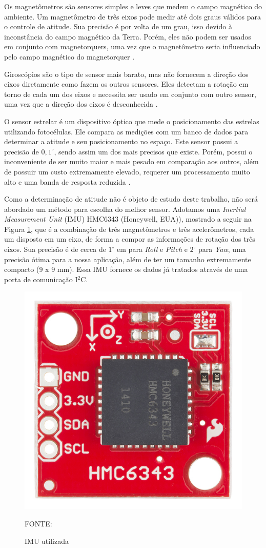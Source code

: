 \documentclass[
	12pt,				%
	openany,			%
	twoside,			%
	a4paper,			%
	english,			%
	french,				%
	spanish,			%
	brazil,				%
	oldfontcommands
	]{abntex2}
\begin{document}
Os magnetômetros são sensores simples e leves que medem o campo magnético do ambiente. Um magnetômetro de três eixos pode medir até dois graus válidos para o controle de atitude. Sua precisão é por volta de um grau, isso devido à inconstância do campo magnético da Terra. Porém, eles não podem ser usados em conjunto com magnetorquers, uma vez que o magnetômetro seria influenciado pelo campo magnético do magnetorquer \cite{FrancLav}.

Giroscópios são o tipo de sensor mais barato, mas não fornecem a direção dos eixos diretamente como fazem os outros sensores. Eles detectam a rotação em torno de cada um dos eixos e necessita ser usado em conjunto com outro sensor, uma vez que a direção dos eixos é desconhecida \cite{FrancLav}.

O sensor estrelar é um dispositivo óptico que mede o posicionamento das estrelas utilizando fotocélulas. Ele compara as medições com um banco de dados para determinar a atitude e seu posicionamento no espaço. Este sensor possui a precisão de $0,1^{\circ}$, sendo assim um dos mais precisos que existe. Porém, possui o inconveniente de ser muito maior e mais pesado em comparação aos outros, além de possuir um custo extremamente elevado, requerer um processamento muito alto e uma banda de resposta reduzida \cite{FrancLav}.

Como a determinação de atitude não é objeto de estudo deste trabalho, não será abordado um método para escolha do melhor sensor. Adotamos uma \textit{Inertial Measurement Unit} (IMU) HMC6343 (Honeywell, EUA)), mostrado a seguir na Figura \ref{fig:IMU}, que é a combinação de três magnetômetros e três acelerômetros, cada um disposto em um eixo, de forma a compor as informações de rotação dos três eixos. Sua precisão é de cerca de $1^{\circ}$ em para \textit{Roll} e \textit{Pitch} e $2^{\circ}$ para \textit{Yaw}, uma precisão ótima para a nossa aplicação, além de ter um tamanho extremamente compacto (9 x 9 mm). Essa IMU fornece os dados já tratados através de uma porta de comunicação I$^{2}$C.

\begin{figure}[th]
	\caption{IMU utilizada}
	\centering
	\includegraphics[width=0.6\linewidth]{./figs/IMU-HMC6343}
	
	\begin{small}
		FONTE: \cite{IMU}
	\end{small}
	\label{fig:IMU}
\end{figure}
\end{document}
